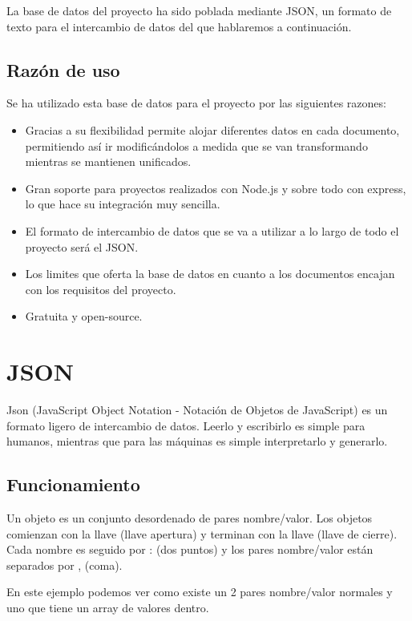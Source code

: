 La base de datos del proyecto ha sido poblada mediante JSON, un formato de texto para el intercambio de datos del que hablaremos a continuación. 

\subsection{Razón de uso}
Se ha utilizado esta base de datos para el proyecto por las siguientes razones:

\begin{itemize}
	\item Gracias a su flexibilidad permite alojar diferentes datos en cada documento, permitiendo así ir modificándolos a medida que se van transformando mientras se mantienen unificados.
	\item Gran soporte para proyectos realizados con Node.js y sobre todo con express, lo que hace su integración muy sencilla.
	\item El formato de intercambio de datos que se va a utilizar a lo largo de todo el proyecto será el JSON.
	\item Los limites que oferta la base de datos en cuanto a los documentos encajan con los requisitos del proyecto.
	\item Gratuita y open-source.
\end{itemize}

\section{JSON}
Json (JavaScript Object Notation - Notación de Objetos de JavaScript) es un formato ligero de intercambio de datos. Leerlo y escribirlo es simple para humanos, mientras que para las máquinas es simple interpretarlo y generarlo.

\subsection{Funcionamiento}
Un objeto es un conjunto desordenado de pares nombre/valor. Los objetos comienzan con la llave { (llave apertura) y terminan con la llave } (llave de cierre). Cada nombre es seguido por : (dos puntos) y los pares nombre/valor están separados por , (coma).


En este ejemplo podemos ver como existe un 2 pares nombre/valor normales y uno que tiene un array de valores dentro.

